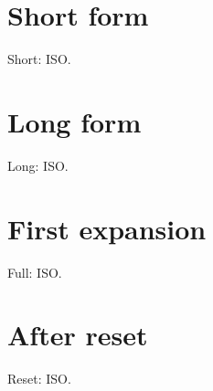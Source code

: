\documentclass{article}
\begin{document}
\makeatletter
\ifx\@multiplelabels\relax\else
\fi
\makeatother
\section{Short form}
Short: \acs{ISO}.
\clearpage
\section{Long form}
Long: \acl{ISO}.
\clearpage
\section{First expansion}
Full: \ac{ISO}.
\clearpage
\section{After reset}
Reset: \acresetall\ac{ISO}.
\end{document}
